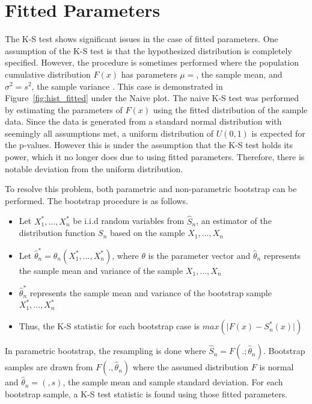 \documentclass[12pt, letterpaper, titlepage]{article}
\makeatletter
\newcommand*{\Xbar}{}%
\DeclareRobustCommand*{\Xbar}{%
  \mathpalette\@Xbar{}%
}
\newcommand*{\@Xbar}[2]{%
  \sbox0{$#1\mathrm{X}\m@th$}%
  \sbox2{$#1X\m@th$}%
  \rlap{%
    \hbox to\wd2{%
      \hfill
      $\overline{%
        \vrule width 0pt height\ht0 %
        \kern\wd0 %
      }$%
    }%
  }%
  \copy2 %
}
\makeatother
\begin{document}
\hypertarget{sec:fitted}{%
\section{Fitted Parameters}\label{sec:fitted}}

The K-S test shows significant issues in the case of fitted parameters. One assumption 
of the K-S test is that the hypothesized distribution is completely specified. 
However, the procedure is sometimes performed where the population cumulative 
distribution $F(x)$ has parameters $\mu=\Xbar$, the sample mean, and $\sigma^2=s^2$, 
the sample variance \citep{Lilliefors}. This case is demonstrated in Figure~\ref{fig:hist_fitted} 
under the Naive plot. The naive K-S test was performed by estimating the parameters 
of $F(x)$ using the fitted distribution of the sample data. Since the data is generated 
from a standard normal distribution with seemingly all assumptions met, a uniform 
distribution of $U(0,1)$ is expected for the p-values. However this is under the 
assumption that the K-S test holds its power, which it no longer does due to using 
fitted parameters. Therefore, there is notable deviation from the uniform distribution. 

To resolve this problem, both parametric and non-parametric bootstrap can be performed. 
The bootstrap procedure is as follows. 

\begin{itemize}
  \item 
    Let $X_1^*,...,X_n^*$ be i.i.d random variables from $\hat{S}_n$, an estimator 
    of the distribution function $S_n$ based on the sample $X_1,...,X_n$
  \item 
    Let $\hat{\theta}_n^* = \theta_n(X_1^*,...,X_n^*)$, where $\theta$ is the 
    parameter vector and $\hat{\theta}_n$ represents the sample mean and variance 
    of the sample $X_1,...,X_n$
  \item 
    $\hat{\theta}_n^*$ represents the sample mean and variance of the bootstrap 
    sample $X_1^*,...,X_n^*$
  \item Thus, the K-S statistic for each bootstrap case is $max(\lvert F(x)-S^*_n(x) \rvert)$
\end{itemize}

In parametric bootstrap, the resampling is done where $\hat{S}_n = F(.;\hat{\theta}_n)$. 
Bootstrap samples are drawn from ${F}(.,\hat{\theta}_n)$ where the assumed distribution 
$F$ is normal and $\hat{\theta}_n = (\Xbar, s)$, the sample mean and sample standard 
deviation. For each bootstrap sample, a K-S test statistic is found using those 
fitted parameters.
\end{document}
